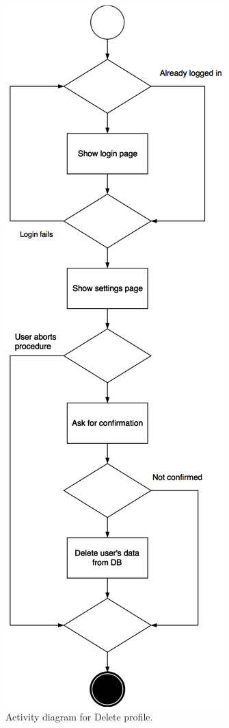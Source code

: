 \documentclass{article}
\begin{document}
	\begin{figure}[h!]
		\bigskip
		\centering
		\includegraphics[scale=0.25]{img/diagrams/delete_profile_ad.png}
		\caption{Activity diagram for Delete profile.}
	\end{figure}
	\newpage
	
\end{document}
